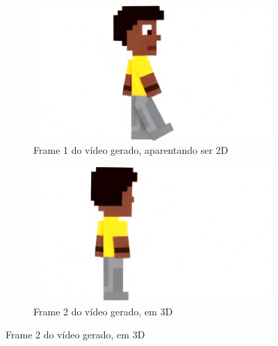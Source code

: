 \begin{figure}[htbp]
\begin{subfigure}{0.4\linewidth}
        \label{fig:vidu3a}
    \end{subfigure}
    \begin{subfigure}{0.4\linewidth}
        \includegraphics[width=1\linewidth]{figs/vidu/frame5_2D.jpg}
        \caption{\small Frame 1 do vídeo gerado, aparentando ser 2D}
        \label{fig:vidu3b}
    \end{subfigure}
    \begin{subfigure}{0.4\linewidth}
        \includegraphics[width=1\linewidth]{figs/vidu/frame5_3D.jpg}
        \caption{\small Frame 2 do vídeo gerado, em 3D}
        \label{fig:vidu3c}
    \end{subfigure}

\end{figure}

